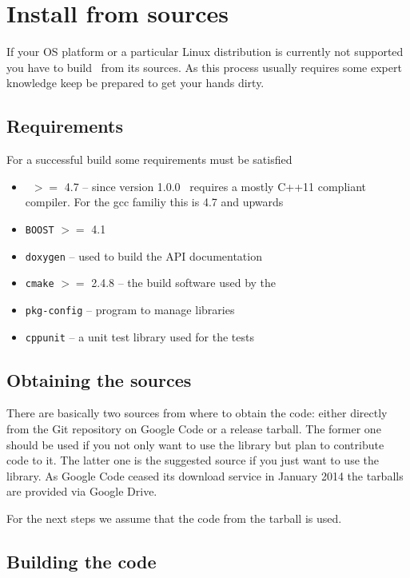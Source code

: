 \section{Install from sources}

If your OS platform or a particular Linux distribution is currently not
supported you have to build \libpnicore\ from its sources. As this process
usually requires some expert knowledge keep be prepared to get your hands dirty.

\subsection{Requirements}

For a successful build some requirements must be satisfied 
\begin{itemize} 
\item \gcc\ $>=$ 4.7 -- since version 1.0.0 \libpnicore\ requires a mostly C++11
compliant compiler. For the gcc familiy this is 4.7 and upwards 
\item {\tt BOOST} \cite{web:boostsite} $>=$ 4.1 
\item {\tt doxygen} \cite{web:doxygen} -- used to build the API documentation 
\item {\tt cmake} \cite{web:cmake} $>=$ 2.4.8 -- the build software used by the \libpnicore
\item {\tt pkg-config} \cite{web:pkgconfig} -- program to manage libraries
\item {\tt cppunit} \cite{web:cppunit} -- a unit test library used for the tests
\end{itemize}

\subsection{Obtaining the sources}

There are basically two sources from where to obtain the code: either directly
from the Git repository on Google Code or a release tarball. The former one
should be used if you not only want to use the library but plan to contribute
code to it. The latter one is the suggested source if you just want to use the
library. 
As Google Code ceased its download service in January 2014 the tarballs are
provided via Google Drive. 

For the next steps we assume that the code from the tarball is used. 

\subsection{Building the code}

